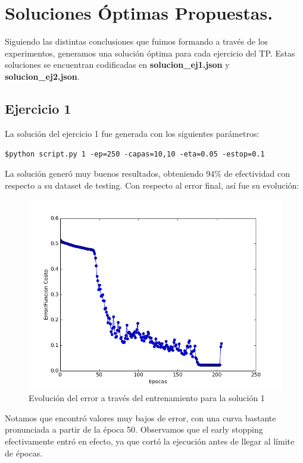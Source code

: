 \newpage
\section{Soluciones Óptimas Propuestas.}

Siguiendo las distintas conclusiones que fuimos formando a través de los experimentos, generamos una solución óptima para cada ejercicio del TP. Estas soluciones se encuentran codificadas en \textbf{solucion\_ej1.json} y \textbf{solucion\_ej2.json}.

\subsection{Ejercicio 1}
La solución del ejercicio 1 fue generada con los siguientes parámetros:

\texttt{\$python script.py 1 -ep=250 -capas=10,10 -eta=0.05 -estop=0.1}

La solución generó muy buenos resultados, obteniendo 94\% de efectividad con respecto a su dataset de testing.
Con respecto al error final, así fue su evolución:

\begin{figure}[h]
  \begin{center}
  \includegraphics[scale=0.50]{graficos/solucion_ej1.png}
  \caption{Evolución del error a través del entrenamiento para la solución 1}
  \end{center}
\end{figure}

Notamos que encontró valores muy bajos de error, con una curva bastante pronunciada a partir de la época 50. Observamos que el early stopping efectivamente entró en efecto, ya que cortó la ejecución antes de llegar al límite de épocas.\\

